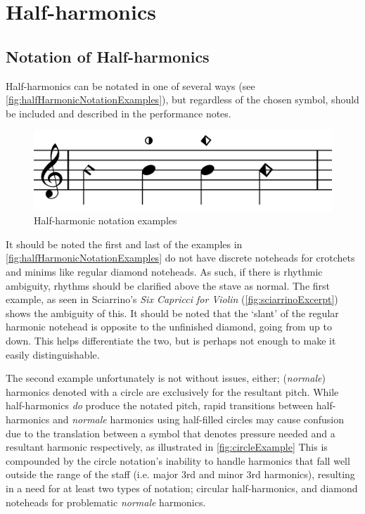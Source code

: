 \section{Half-harmonics} \label{sec:half-harmonics}

\subsection{Notation of Half-harmonics} \label{sec:notation-half-harmonics}
Half-harmonics can be notated in one of several ways (see \autoref{fig:halfHarmonicNotationExamples}), but regardless of the chosen symbol, should be included and described in the performance notes.


\begin{figure}
    \includegraphics[width=\linewidth]{./resources/halfHarmonicNotationExamples.pdf}
    \caption{Half-harmonic notation examples} \label{fig:halfHarmonicNotationExamples}
  \end{figure}

It should be noted the first and last of the examples in \autoref{fig:halfHarmonicNotationExamples} do not have discrete noteheads for crotchets and minims like regular diamond noteheads.
As such, if there is rhythmic ambiguity, rhythms should be clarified above the stave as normal.
The first example, as seen in Sciarrino's \emph{Six Capricci for Violin} (\autoref{fig:sciarrinoExcerpt}) shows the ambiguity of this.
It should be noted that the `slant' of the regular harmonic notehead is opposite to the unfinished diamond, going from up to down.
This helps differentiate the two, but is perhaps not enough to make it easily distinguishable.

The second example unfortunately is not without issues, either; (\emph{normale}) harmonics denoted with a circle are exclusively for the resultant pitch.\autocite[419]{gouldBars2011} 
While half-harmonics \emph{do} produce the notated pitch, rapid transitions between half-harmonics and \emph{normale} harmonics using half-filled circles may cause confusion due to the translation between a symbol that denotes pressure needed and a resultant harmonic respectively, as illustrated in \autoref{fig:circleExample}
This is compounded by the circle notation's inability to handle harmonics that fall well outside the range of the staff (i.e. major 3rd and minor 3rd harmonics), resulting in a need for at least two types of notation; circular half-harmonics, and diamond noteheads for problematic \emph{normale} harmonics.

